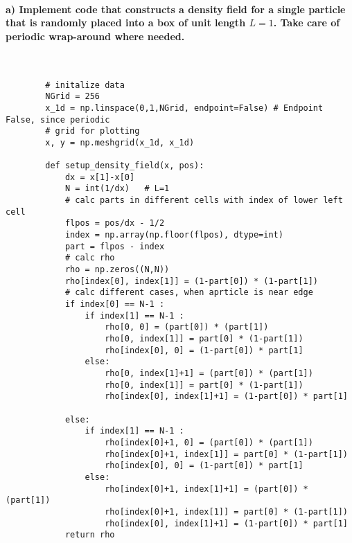 \paragraph{a) Implement code that constructs a density field for a single 
    particle that is randomly placed into a box of unit length $L=1$. 
    Take care of periodic wrap-around where needed.
} \ \\
    \begin{lstlisting}
        # initalize data
        NGrid = 256
        x_1d = np.linspace(0,1,NGrid, endpoint=False) # Endpoint False, since periodic
        # grid for plotting
        x, y = np.meshgrid(x_1d, x_1d)

        def setup_density_field(x, pos):
            dx = x[1]-x[0]
            N = int(1/dx)   # L=1
            # calc parts in different cells with index of lower left cell
            flpos = pos/dx - 1/2
            index = np.array(np.floor(flpos), dtype=int)
            part = flpos - index
            # calc rho
            rho = np.zeros((N,N))
            rho[index[0], index[1]] = (1-part[0]) * (1-part[1])
            # calc different cases, when aprticle is near edge
            if index[0] == N-1 :
                if index[1] == N-1 :
                    rho[0, 0] = (part[0]) * (part[1])
                    rho[0, index[1]] = part[0] * (1-part[1])
                    rho[index[0], 0] = (1-part[0]) * part[1]
                else:
                    rho[0, index[1]+1] = (part[0]) * (part[1])
                    rho[0, index[1]] = part[0] * (1-part[1])
                    rho[index[0], index[1]+1] = (1-part[0]) * part[1]
        
            else:
                if index[1] == N-1 :
                    rho[index[0]+1, 0] = (part[0]) * (part[1])
                    rho[index[0]+1, index[1]] = part[0] * (1-part[1])
                    rho[index[0], 0] = (1-part[0]) * part[1]
                else:
                    rho[index[0]+1, index[1]+1] = (part[0]) * (part[1])
                    rho[index[0]+1, index[1]] = part[0] * (1-part[1])
                    rho[index[0], index[1]+1] = (1-part[0]) * part[1]
            return rho\end{lstlisting}


